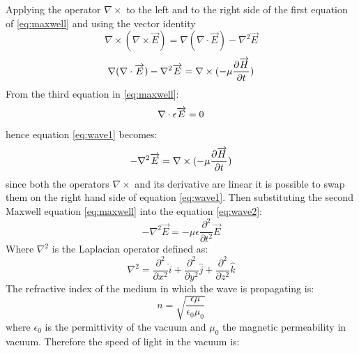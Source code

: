 Applying the operator $\nabla\times$ to the left and to the right side of the first equation of \ref{eq:maxwell} and using the vector identity\\
\begin{equation}
\label{eq:vectidentity}
\nabla\times(\nabla\times\overrightarrow{E})=\nabla (\nabla\cdot\overrightarrow{E})-\nabla^2\overrightarrow{E}
\end{equation}
\begin{equation}
\label{eq:wave1}
	\nabla (\nabla\cdot\overrightarrow{E})-\nabla^2\overrightarrow{E}=\nabla\times(-\mu\dfrac{\partial\overrightarrow{H}}{\partial t})\\
\end{equation}
From the third equation in \ref{eq:maxwell}:\\
\begin{equation}
\label{eq:divergenza}
\nabla\cdot\epsilon\overrightarrow{E}=0\\
\end{equation}
hence equation \ref{eq:wave1} becomes:\\
\begin{equation}
\label{eq:wave2}
-\nabla^2\overrightarrow{E}=\nabla\times(-\mu\dfrac{\partial\overrightarrow{H}}{\partial t})\\
\end{equation}
since both the operators $\nabla\times$ and its derivative are linear it is possible to swap them on the right hand side of equation \ref{eq:wave1}.
Then substituting the second Maxwell equation \ref{eq:maxwell} into the equation \ref{eq:wave2}:
\begin{equation}
\label{eq:wave3}
-\nabla^2\overrightarrow{E}=-\mu\epsilon\dfrac{\partial^2}{\partial t^2}\overrightarrow{E}	
\end{equation}
Where $\nabla^2$ is the Laplacian operator defined as:
\begin{equation}
	\label{eq:laplacian}
	\nabla^2=\dfrac{\partial^2}{\partial x^2}\widehat{i}+\dfrac{\partial^2}{\partial y^2}\widehat{j}+\dfrac{\partial^2}{\partial z^2}\widehat{k}	
\end{equation}
The refractive index of the medium in which the wave is propagating is:\\
\begin{equation}
\label{eq:n}
n=\sqrt{\dfrac{\epsilon\mu}{\epsilon_0\mu_0}}
\end{equation} 
where $\epsilon_0$ is the permittivity of the vacuum and $\mu_0$ the magnetic permeability in vacuum. Therefore the speed of light in the vacuum is:
